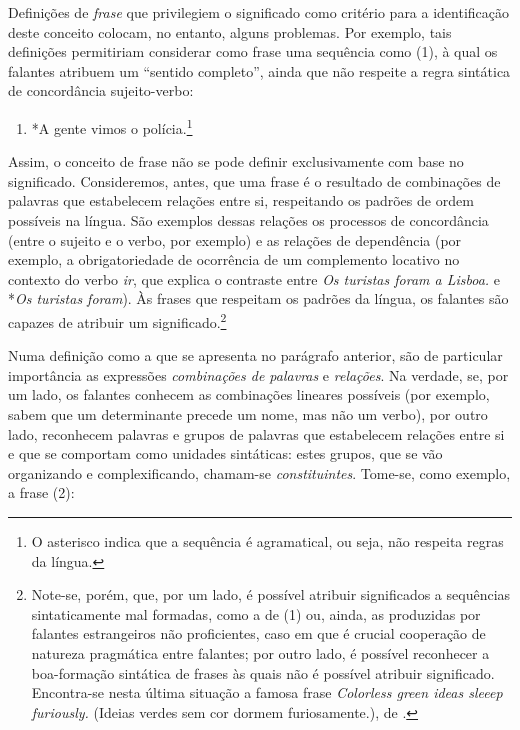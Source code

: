 \documentclass[output=paper,colorlinks,citecolor=brown,booklanguage=portuguese]{langscibook}
\begin{document}
Definições de \emph{frase} que privilegiem o significado como critério para a identificação deste conceito colocam, no entanto, alguns problemas. Por exemplo, tais definições permitiriam considerar como frase uma sequência como (1), à qual os falantes atribuem um “sentido completo”, ainda que não respeite a regra sintática de concordância sujeito-verbo:

\begin{enumerate}[align=left]
    \item [(1)] *A gente vimos o polícia.\footnote{O asterisco indica que a sequência é agramatical, ou seja, não respeita regras da língua.}
\end{enumerate}

Assim, o conceito de frase não se pode definir exclusivamente com base no significado. Consideremos, antes, que uma frase é o resultado de combinações de palavras que estabelecem relações entre si, respeitando os padrões de ordem possíveis na língua. São exemplos dessas relações os processos de concordância (entre o sujeito e o verbo, por exemplo) e as relações de dependência (por exemplo, a obrigatoriedade de ocorrência de um complemento locativo no contexto do verbo \emph{ir}, que explica o contraste entre \emph{Os turistas foram a Lisboa.} e *\emph{Os turistas foram}). Às frases que respeitam os padrões da língua, os falantes são capazes de atribuir um significado.\footnote{Note-se, porém, que, por um lado, é possível atribuir significados a sequências sintaticamente mal formadas, como a de (1) ou, ainda, as produzidas por falantes estrangeiros não proficientes, caso em que é crucial cooperação de natureza pragmática entre falantes; por outro lado, é possível reconhecer a boa-formação sintática de frases às quais não é possível atribuir significado. Encontra-se nesta última situação a famosa frase \emph{Colorless green ideas sleeep furiously.} (Ideias verdes sem cor dormem furiosamente.), de \citet{Chomsky1957}.} 

Numa definição como a que se apresenta no parágrafo anterior, são de particular importância as expressões \emph{combinações de palavras} e \emph{relações}. Na verdade, se, por um lado, os falantes conhecem as combinações lineares possíveis (por exemplo, sabem que um determinante precede um nome, mas não um verbo), por outro lado, reconhecem palavras e grupos de palavras que estabelecem relações entre si e que se comportam como unidades sintáticas: estes grupos, que se vão organizando e complexificando, chamam-se \emph{constituintes}. Tome-se, como exemplo, a frase (2):
\end{document}
